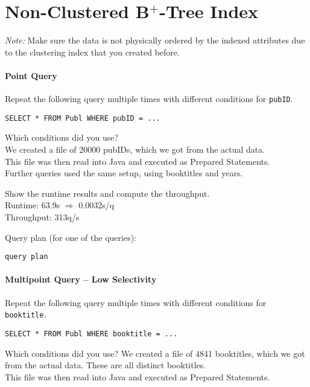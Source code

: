 \documentclass[11pt]{scrartcl}
\begin{document}
\section{Non-Clustered B$^+$-Tree Index}

\noindent \emph{Note:} Make sure the data is not physically ordered by
the indexed attributes due to the clustering index that you created
before.

\paragraph{Point Query}

Repeat the following query multiple times with different conditions for {\tt pubID}.

{\small
\begin{verbatim}
SELECT * FROM Publ WHERE pubID = ...
\end{verbatim}
}

\noindent
Which conditions did you use?\\
We created a file of 20000 pubIDs, which we got from the actual data.\\
This file was then read into Java and executed as Prepared Statements.\\
Further queries used the same setup, using booktitles and years.

\smallskip\noindent
Show the runtime results and compute the throughput.\\
Runtime: 63.9s $\Rightarrow$ 0.0032s/q\\
Throughput: 313q/s

\smallskip\noindent
Query plan (for one of the queries):
{\small
\begin{verbatim}
query plan
\end{verbatim}
}


\paragraph{Multipoint Query -- Low Selectivity}

Repeat the following query multiple times with different conditions for {\tt booktitle}.

{\small
\begin{verbatim}
SELECT * FROM Publ WHERE booktitle = ...
\end{verbatim}
}

\noindent
Which conditions did you use?
We created a file of 4841 booktitles, which we got from the actual data. These are all distinct booktitles.\\
This file was then read into Java and executed as Prepared Statements.
\end{document}
